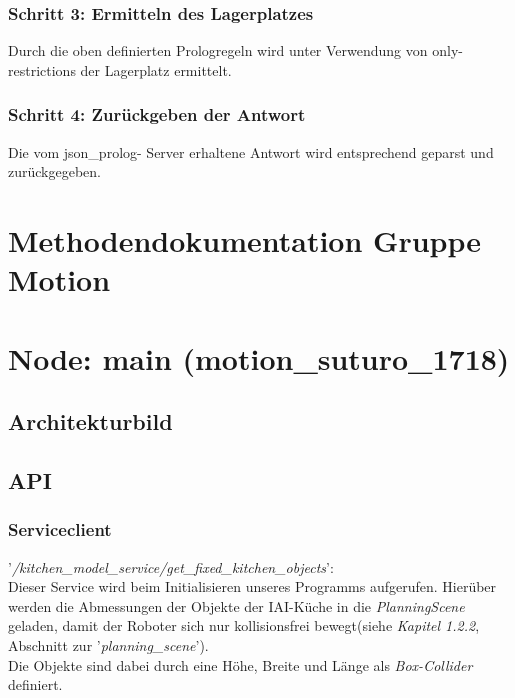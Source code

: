 \documentclass{suturo}
\begin{document}
\subsubsection{Schritt 3: Ermitteln des Lagerplatzes} 
Durch die oben definierten Prologregeln wird unter Verwendung von only- restrictions der Lagerplatz ermittelt.
\subsubsection{Schritt 4: Zurückgeben der Antwort}
Die vom json\_prolog- Server erhaltene Antwort wird entsprechend geparst und zurückgegeben.

\newpage

\section*{Methodendokumentation Gruppe Motion}
\section{Node: main (motion\_suturo\_1718)}
\subsection{Architekturbild}
\begin{figure}[!htb]
\end{figure}

\subsection{API}
\subsubsection{Serviceclient}
'\textit{/kitchen\_model\_service/get\_fixed\_kitchen\_objects}': \\
Dieser Service wird beim Initialisieren unseres Programms aufgerufen. Hierüber werden die Abmessungen der Objekte der IAI-Küche in die \textit{PlanningScene} geladen, damit der Roboter sich nur kollisionsfrei bewegt(siehe \textit{Kapitel 1.2.2}, Abschnitt zur '\textit{planning\_scene}').\\
Die Objekte sind dabei durch eine Höhe, Breite und Länge als \textit{Box-Collider} definiert.
\end{document}

